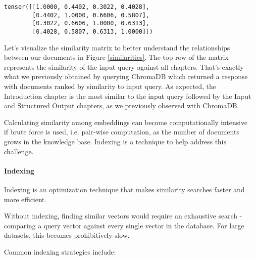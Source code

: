 \begin{verbatim}
tensor([[1.0000, 0.4402, 0.3022, 0.4028],
        [0.4402, 1.0000, 0.6606, 0.5807],
        [0.3022, 0.6606, 1.0000, 0.6313],
        [0.4028, 0.5807, 0.6313, 1.0000]])
\end{verbatim}

Let's visualize the similarity matrix to better understand the relationships between our documents in Figure \ref{similarities}. The top row of the matrix represents the similarity of the input query against all chapters. That's exactly what we previously obtained by querying ChromaDB which returned a response with documents ranked by similarity to input query. As expected, the Introduction chapter is the most similar to the input query followed by the Input and Structured Output chapters, as we previously observed with ChromaDB.



Calculating similarity among embeddings can become computationally intensive if brute force is used, i.e. pair-wise computation, as the number of documents grows in the knowledge base. Indexing is a technique to help address this challenge.

\paragraph{Indexing}

Indexing is an optimization technique that makes similarity searches faster and more efficient.

Without indexing, finding similar vectors would require an exhaustive search - comparing a query vector against every single vector in the database. For large datasets, this becomes prohibitively slow.

Common indexing strategies include:

